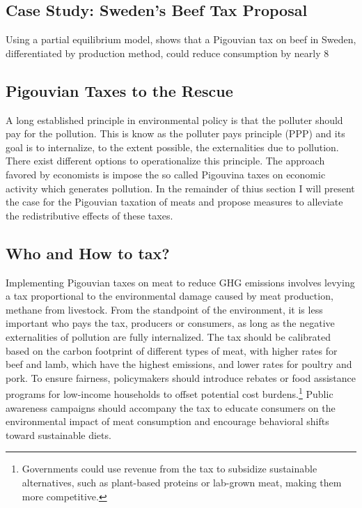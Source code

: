 \documentclass{article}[12pt,letterpaper]
\begin{document}
\subsection{Case Study: Sweden’s Beef Tax Proposal}
Using a partial equilibrium model, \citet{Martensson2014} shows that a Pigouvian tax on beef in Sweden, differentiated by production method, could reduce consumption by nearly 8%

\subsection{Pigouvian Taxes to the Rescue}
A long established principle in environmental policy is that the polluter should pay for the pollution. This is know as the polluter pays principle (PPP) and its goal is to internalize, to the extent possible, the externalities due to pollution. There exist different options to operationalize this principle. The approach favored by economists is impose the so called Pigouvina taxes on economic activity which generates pollution. In the remainder of thius section I will present the case for the Pigouvian taxation of meats and propose measures to alleviate the redistributive effects of these taxes. 

\subsection{Who and How to tax?}
Implementing Pigouvian taxes on meat to reduce GHG emissions involves levying a tax proportional to the environmental damage caused by meat production, methane from livestock. From the standpoint of the environment, it is less important who pays the tax, producers or consumers, as long as the negative externalities of pollution are fully internalized. The tax should be calibrated based on the carbon footprint of different types of meat, with higher rates for beef and lamb, which have the highest emissions, and lower rates for poultry and pork. To ensure fairness, policymakers should introduce rebates or food assistance programs for low-income households to offset potential cost burdens.\footnote{Governments could use revenue from the tax to subsidize sustainable alternatives, such as plant-based proteins or lab-grown meat, making them more competitive.} Public awareness campaigns should accompany the tax to educate consumers on the environmental impact of meat consumption and encourage behavioral shifts toward sustainable diets.
\end{document}
